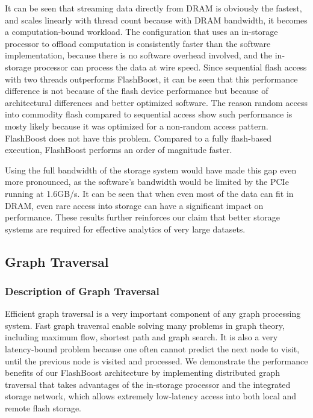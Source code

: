 It can be seen that streaming data directly from DRAM is obviously the fastest,
and scales linearly with thread count because with DRAM bandwidth, it becomes a
computation-bound workload. The configuration that uses an in-storage processor
to offload computation is consistently faster than the software implementation,
because there is no software overhead involved, and the in-storage processor can
process the data at wire speed. Since sequential flash access with two threads
outperforms FlashBoost, it can be seen that this performance difference is not
because of the flash device performance but because of architectural differences
and better optimized software. The reason random access into commodity flash
compared to sequential access show such performance is mosty likely because it
was optimized for a non-random access pattern. FlashBoost does not have this
problem. Compared to a fully flash-based execution, FlashBoost performs an order
of magnitude faster.

Using the full bandwidth of the storage system would
have made this gap even more pronounced, as the software's bandwidth would be
limited by the PCIe running at 1.6GB/s. It can be seen that when even most of
the data can fit in DRAM, even rare access into storage can have a significant
impact on performance. These results further reinforces our claim that better
storage systems are required for effective analytics of very large datasets.


\subsection{Graph Traversal}

\subsubsection{Description of Graph Traversal}

Efficient graph traversal is a very important component of any graph processing
system. Fast graph traversal enable solving many problems in graph theory,
including maximum flow, shortest path and graph search. It is also a very
latency-bound problem because one often cannot predict the next node to visit,
until the previous node is visited and processed. We demonstrate the performance
benefits of our FlashBoost architecture by implementing distributed graph
traversal that takes advantages of the in-storage processor and the integrated
storage network, which allows extremely low-latency access into both local and
remote flash storage.  

